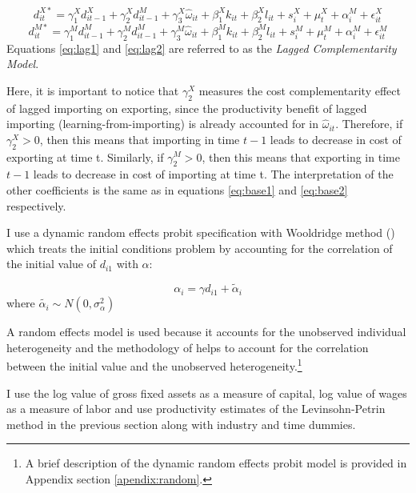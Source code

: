 \documentclass[12pt]{article}
\begin{document}
\begin{equation}
\label{eq:lag1}
d_{it}^{X*}=   \gamma_{1}^{X} d_{it-1}^{X} + \gamma_{2}^{X} d_{it-1}^{M}+
\gamma_{3}^{X} \hat{\omega}_{it}  + \beta_{1}^{X}k_{it}  +\beta_{2}^{X}l_{it}+
s_{i}^{X} + \mu_{t}^{X}  + \alpha_{i}^{M}+ \epsilon_{it}^{X}
\end{equation}
\begin{equation}
\label{eq:lag2}
d_{it}^{M*}=   \gamma_{1}^{M} d_{it-1}^{M} + \gamma_{2}^{M} d_{it-1}^{M}+
\gamma_{3}^{M} \hat{\omega}_{it}  + \beta_{1}^{M}k_{it}  +\beta_{2}^{M}l_{it}+
s_{i}^{M} + \mu_{t}^{M}  + \alpha_{i}^{M}+ \epsilon_{it}^{M}
\end{equation}
Equations \ref{eq:lag1} and \ref{eq:lag2} are referred to as the
\textit{Lagged Complementarity Model}. 

Here, it is important to notice that  $\gamma_{2}^{X}$ measures the
cost complementarity effect of lagged importing on
exporting, since the productivity benefit of lagged importing
(learning-from-importing) is already
accounted for in $\hat{\omega}_{it}$. Therefore, if $\gamma_{2}^{X}>0$, then this means that
importing in time $t-1$ leads to decrease in cost of exporting at time t.  
Similarly, if  $\gamma_{2}^{M}>0$, then this means that
exporting in time $t-1$ leads to decrease in cost of importing at time
t. The interpretation of the other coefficients is the same as in
equations \ref{eq:base1} and \ref{eq:base2} respectively. 
  
I use a dynamic random effects probit specification with Wooldridge
method (\textcite{wooldridge2005simple}) which treats the initial conditions problem by accounting for
the correlation of the initial value of $d_{i1}$ with $\alpha$:


$$  \alpha_{i}= \gamma d_{i1}+ \tilde{\alpha}_{i} $$
where $ \tilde{\alpha_{i}} \sim N(0, \sigma_{\alpha}^{2}) $

A random effects model is used because it accounts for the unobserved
individual heterogeneity and the methodology of
\textcite{wooldridge2005simple} helps to account for the correlation
between the initial value and the unobserved heterogeneity.\footnote{A
  brief description of the dynamic random effects probit model is
  provided in Appendix section \ref{apendix:random}.}
 
I use the log value of gross fixed assets as a measure of capital, log
value of wages as a measure of labor and use productivity estimates  of
the Levinsohn-Petrin method in the previous section along with
industry and time dummies.  
\end{document}
